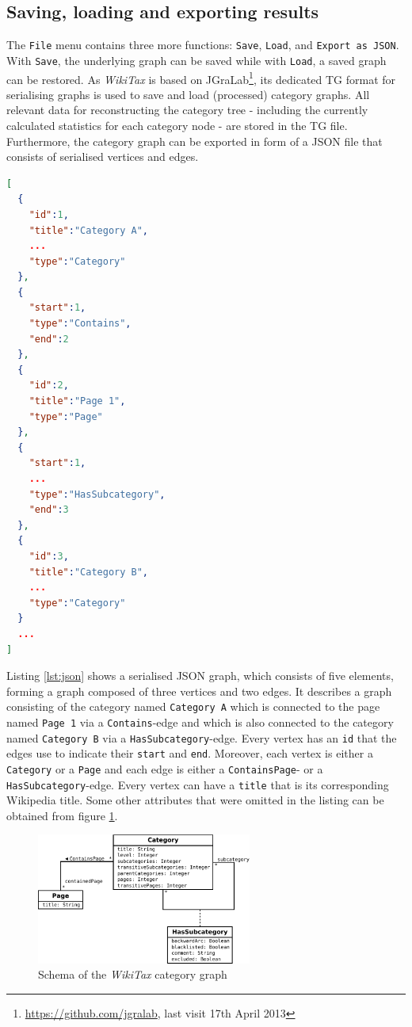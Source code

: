 \documentclass{scrartcl}
\begin{document}
\subsection{Saving, loading and exporting results}
\label{sec:save}
The \texttt{File} menu contains three more functions: \texttt{Save}, \texttt{Load},  and \texttt{Export as JSON}. With \texttt{Save}, the underlying graph can be saved while with \texttt{Load}, a saved graph can be restored. As \emph{WikiTax} is based on JGraLab\footnote{\url{https://github.com/jgralab}, last visit 17th April 2013}, its dedicated TG format for serialising graphs is used to save and load (processed) category graphs. All relevant data for reconstructing the category tree - including the currently calculated statistics for each category node - are stored in the TG file. Furthermore, the category graph can be exported in form of a JSON file \cite{RFC4627} that consists of serialised vertices and edges.

\begin{lstlisting}[frame=single,captionpos=b,caption={Serialised graph in JSON format (shortened)},label={lst:json},language=json]
[
  {
    "id":1,
    "title":"Category A",
    ...
    "type":"Category"
  },
  {
    "start":1,
    "type":"Contains",
    "end":2
  },
  {
    "id":2,
    "title":"Page 1",
    "type":"Page"
  },
  {
    "start":1,
    ...
    "type":"HasSubcategory",
    "end":3
  },
  {
    "id":3,
    "title":"Category B",
    ...
    "type":"Category"
  }
  ...
]
\end{lstlisting}

Listing \ref{lst:json} shows a serialised JSON graph, which consists of five elements, forming a graph composed of three vertices and two edges. It describes a graph consisting of the category named \texttt{Category A} which is connected to the page named \texttt{Page 1} via a \texttt{Contains}-edge and which is also connected to the category named \texttt{Category B} via a \texttt{HasSubcategory}-edge. Every vertex has an \texttt{id} that the edges use to indicate their \texttt{start} and \texttt{end}. Moreover, each vertex is either a \texttt{Category} or a \texttt{Page} and each edge is either a \texttt{ContainsPage}- or a \texttt{HasSubcategory}-edge. Every vertex can have a \texttt{title} that is its corresponding Wikipedia title. Some other attributes that were omitted in the listing can be obtained from figure \ref{fig:full_schema}.

\begin{figure}[ht]
\centering
\includegraphics[width=0.63\textwidth]{figures/full_schema.pdf} 
\caption{Schema of the \emph{WikiTax} category graph}
\label{fig:full_schema}
\end{figure}
\end{document}

